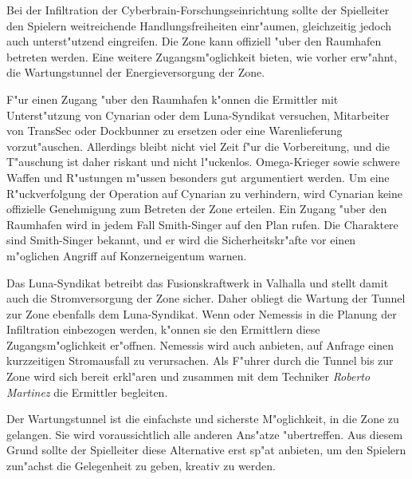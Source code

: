 Bei der Infiltration der Cyberbrain-Forschungseinrichtung sollte der Spielleiter den Spielern weitreichende Handlungsfreiheiten einr"aumen, gleichzeitig jedoch auch unterst"utzend eingreifen. Die Zone kann offiziell "uber den Raumhafen betreten werden. Eine weitere Zugangsm"oglichkeit bieten, wie vorher erw"ahnt, die Wartungstunnel der Energieversorgung der Zone.

F"ur einen Zugang "uber den Raumhafen k"onnen die Ermittler mit Unterst"utzung von Cynarian oder dem Luna-Syndikat versuchen, Mitarbeiter von TransSec oder Dockbunner zu ersetzen oder eine Warenlieferung vorzut"auschen. Allerdings bleibt nicht viel Zeit f"ur die Vorbereitung, und die T"auschung ist daher riskant und nicht l"uckenlos. Omega-Krieger sowie schwere Waffen und R"ustungen m"ussen besonders gut argumentiert werden. Um eine R"uckverfolgung der Operation auf Cynarian zu verhindern, wird Cynarian keine offizielle Genehmigung zum Betreten der Zone erteilen. Ein Zugang "uber den Raumhafen wird in jedem Fall Smith-Singer auf den Plan rufen. Die Charaktere sind Smith-Singer bekannt, und er wird die Sicherheitskr"afte vor einen m"oglichen Angriff auf Konzerneigentum warnen. 

Das Luna-Syndikat betreibt das Fusionskraftwerk in Valhalla und stellt damit auch die Stromversorgung der Zone sicher. Daher obliegt die Wartung der Tunnel zur Zone ebenfalls dem Luna-Syndikat. Wenn \xl{} oder Nemessis in die Planung der Infiltration einbezogen werden, k"onnen sie den Ermittlern diese Zugangsm"oglichkeit er"offnen. Nemessis wird auch anbieten, auf Anfrage einen kurzzeitigen Stromausfall zu verursachen. Als F"uhrer durch die Tunnel bis zur Zone wird sich \xl{} bereit erkl"aren und zusammen mit dem Techniker \emph{Roberto Martinez} die Ermittler begleiten.

\begin{remarks}
	Der Wartungstunnel ist die einfachste und sicherste M"oglichkeit, in die Zone zu gelangen. Sie wird voraussichtlich alle anderen Ans"atze "ubertreffen. Aus diesem Grund sollte der Spielleiter diese Alternative erst sp"at anbieten, um den Spielern zun"achst die Gelegenheit zu geben, kreativ zu werden.
\end{remarks}

